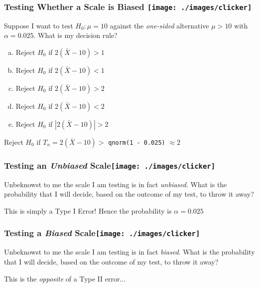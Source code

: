 \begin{frame}[t]
	\frametitle{Testing Whether a Scale is Biased \hfill \texttt{[image: ./images/clicker]}}

	\vspace{1em}

	Suppose I want to test $H_0\colon \mu = 10$ against the \emph{one-sided} alternative $\mu > 10$ with $\alpha = 0.025$. What is my decision rule? 

	\vspace{1em}

	\begin{enumerate}[(a)]
		\item Reject $H_0$ if $2(\bar{X} - 10) > 1$ 
		\item Reject $H_0$ if $2(\bar{X} - 10) < 1$ 
		\item Reject $H_0$ if $2(\bar{X} - 10) > 2$ 
		\item Reject $H_0$ if $2(\bar{X} - 10) < 2$ 
		\item Reject $H_0$ if $|2(\bar{X} - 10)| > 2$ 
	\end{enumerate}

	\pause
	\alert{Reject $H_0$ if $T_n = 2(\bar{X} - 10) >$ \texttt{qnorm(1 - 0.025)} $\approx 2$}
\end{frame}
\begin{frame}
	\frametitle{Testing an \emph{Unbiased} Scale\hfill \texttt{[image: ./images/clicker]}}
	 Unbeknowst to me the scale I am testing is in fact \emph{unbiased}.
	 What is the probability that I will decide, based on the outcome of my test, to throw it away?

	 \vspace{2em}
	\pause

	\alert{This is simply a Type I Error! Hence the probability is $\alpha = 0.025$}
\end{frame}
\begin{frame}
	\frametitle{Testing a \emph{Biased} Scale\hfill \texttt{[image: ./images/clicker]}}
	 Unbeknowst to me the scale I am testing is in fact \emph{biased}.
	 What is the probability that I will decide, based on the outcome of my test, to throw it away?

\pause

\vspace{1em}

\alert{This is the \emph{opposite} of a Type II error...}
\end{frame}
